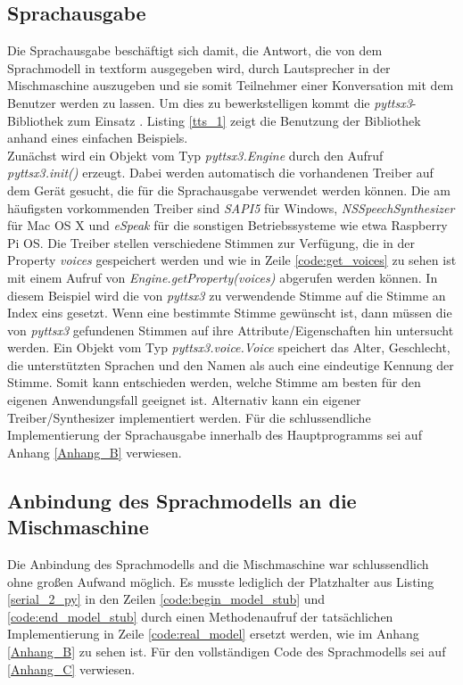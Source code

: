 \subsection{Sprachausgabe} 
Die Sprachausgabe beschäftigt sich damit, die Antwort, die von dem Sprachmodell in textform ausgegeben wird, durch Lautsprecher in der Mischmaschine auszugeben und sie somit Teilnehmer einer Konversation mit dem Benutzer werden zu lassen. Um dies zu bewerkstelligen kommt die \textit{pyttsx3}-Bibliothek zum Einsatz \cite{pyttsx3}. Listing \ref{tts_1} zeigt die Benutzung der Bibliothek anhand eines einfachen Beispiels.\\

Zunächst wird ein Objekt vom Typ \textit{pyttsx3.Engine} durch den Aufruf \textit{pyttsx3.init()} erzeugt. Dabei werden automatisch die vorhandenen Treiber auf dem Gerät gesucht, die für die Sprachausgabe verwendet werden können. Die am häufigsten vorkommenden Treiber sind \textit{SAPI5} für Windows, \textit{NSSpeechSynthesizer} für Mac OS X und \textit{eSpeak} für die sonstigen Betriebssysteme wie etwa Raspberry Pi OS. Die Treiber stellen verschiedene \glqq{}Stimmen\grqq{} zur Verfügung, die in der Property \textit{voices} gespeichert werden und wie in Zeile \ref{code:get_voices} zu sehen ist mit einem Aufruf von \textit{Engine.getProperty(\glqq{}voices\grqq{})} abgerufen werden können. In diesem Beispiel wird die von \textit{pyttsx3} zu verwendende Stimme auf die Stimme an Index eins gesetzt. Wenn eine bestimmte Stimme gewünscht ist, dann müssen die von \textit{pyttsx3} gefundenen Stimmen auf ihre Attribute/Eigenschaften hin untersucht werden. Ein Objekt vom Typ \textit{pyttsx3.voice.Voice} speichert das Alter, Geschlecht, die unterstützten Sprachen und den Namen als auch eine eindeutige Kennung der Stimme. Somit kann entschieden werden, welche Stimme am besten für den eigenen Anwendungsfall geeignet ist. Alternativ kann ein eigener Treiber/Synthesizer implementiert werden. Für die schlussendliche Implementierung der Sprachausgabe innerhalb des Hauptprogramms sei auf Anhang \ref{Anhang_B} verwiesen.
\subsection{Anbindung des Sprachmodells an die Mischmaschine}
Die Anbindung des Sprachmodells and die Mischmaschine war schlussendlich ohne großen Aufwand möglich. Es musste lediglich der Platzhalter aus Listing \ref{serial_2_py} in den Zeilen \ref{code:begin_model_stub} und \ref{code:end_model_stub} durch einen Methodenaufruf der tatsächlichen Implementierung in Zeile \ref{code:real_model} ersetzt werden, wie im Anhang \ref{Anhang_B} zu sehen ist. Für den vollständigen Code des Sprachmodells sei auf \ref{Anhang_C} verwiesen.   
\endinput


